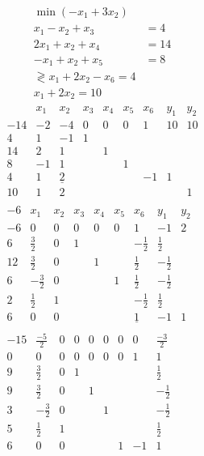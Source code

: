 \begin{example}
\begin{align*}
\min(-x_1 + 3x_2 ) \\
x_1 - x_2 + x_3 &= 4 \\
2x_1 + x_2 + x_4 &= 14 \\
-x_1 + x_2 + x_5 &= 8 \\\gtrless
x_1 + 2x_2 -x_6 = 4 \\
x_1 + 2x_2 = 10
\end{align*}
\begin{align*}
\begin{matrix}
	& x_1 & x_2 & x_3 & x_4 & x_5 & x_6 & y_1 & y_2\\
-14	& -2 & -4 & 0 & 0 & 0 & 1 & 1 0 & 1 0 \\
4 	& 1 & -1 & 1 \\
14	& 2 & 1 & & 1 \\
8	& -1 & 1 & & & 1\\
4	& 1 & \underline{2} & & & &-1 & 1\\
10	& 1 & 2 & & & & & &1
\end{matrix}\\
\begin{matrix}
-6	& x_1 & x_2 & x_3 & x_4 & x_5 & x_6 & y_1 & y_2\\
-6	& 0 & 0 & 0 & 0 & 0 & 1 & -1 & 2 \\
6 	& \tfrac{3}{2} & 0 & 1 & & & -\tfrac{1}{2} & \tfrac{1}{2}\\
12	& \tfrac{3}{2} & 0 & & 1 & & \tfrac{1}{2} & -\tfrac{1}{2}\\
6	& -\tfrac{3}{2} & 0 & & & 1 & \tfrac{1}{2} & -\tfrac{1}{2}\\
2	& \tfrac{1}{2} & 1 & & & & -\tfrac{1}{2} & \tfrac{1}{2}\\
6	& 0 & 0 & & & & \underline{1} & -1 &1
\end{matrix}\\
\begin{matrix}
-15	& \tfrac{-5}{2} & 0 & 0 & 0 & 0 & 0 & 0 & \tfrac{-3}{2}\\
0	& 0 & 0 & 0 & 0 & 0 & 0 & 1 & 1 \\
9 	& \tfrac{3}{2} & 0 & 1 & & & & & \tfrac{1}{2}\\
9	& \tfrac{3}{2} & 0 & & 1 & & & & -\tfrac{1}{2}\\
3	& -\tfrac{3}{2} & 0 & & & 1 & & & -\tfrac{1}{2}\\
5	& \tfrac{1}{2} & 1 & & & & & & \tfrac{1}{2}\\
6	& 0 & 0 & & & & 1  & -1 &1
\end{matrix}\\

\end{align*}
\end{example}
